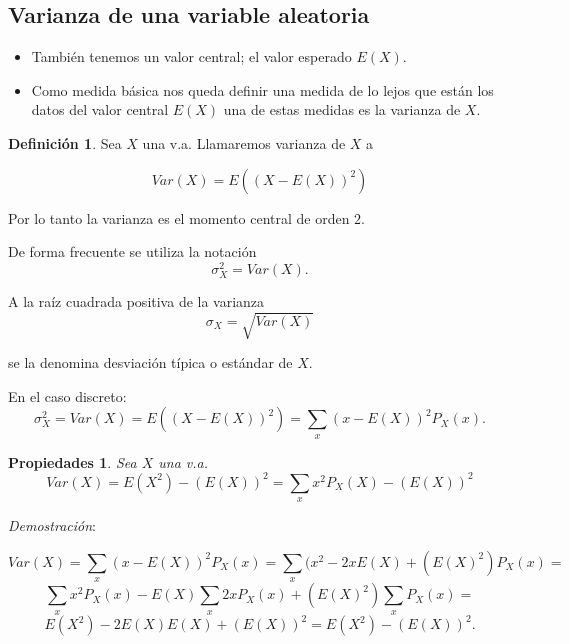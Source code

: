 \documentclass[handout]{beamer}\usepackage[]{graphicx}\usepackage[]{color}
\renewcommand{\emph}[1]{{\color{red}#1}}
\theoremstyle{plain}
\newtheorem{prop}{Propiedades}
\theoremstyle{definition}
\newtheorem{definicion}{Definición}
\begin{document}
\subsection{Varianza de una variable aleatoria}

\begin{frame}
\begin{itemize}
Hemmos descrito el comportamiento aleatorio de una v.a. discreta mediante $P_{X}$ y
$F_{X}$.
\item También tenemos un valor central; el valor esperado $E(X)$. 
\item Como medida básica nos queda definir una medida de lo lejos que están los datos del valor central $E(X)$ una de estas medidas es la varianza de $X$.
\end{itemize}
\end{frame}

\begin{frame}
\begin{definicion}
    Sea $X$ una v.a. Llamaremos \emph{varianza} de $X$ a

    $$Var(X)=E((X-E(X))^2)$$
\end{definicion}

Por lo tanto la varianza es el momento
      central de orden $2$.

    De forma frecuente se utiliza la notación $$\sigma_{X}^2=Var(X).$$
    
    A la raíz cuadrada positiva de la varianza
   $$\sigma_{X}=\sqrt{Var(X)}$$
   
   se la denomina desviación típica  o estándar de $X$.
\end{frame}

\begin{frame}
   En el caso discreto:
 $$\sigma_{X}^2=Var(X)=E((X-E(X))^2)=\sum_{x}(x-E(X))^2 P_{X}(x).$$

\end{frame}

\begin{frame}
 \begin{prop} Sea $X$ una v.a.
 $$Var(X)=E(X^2)-(E(X))^2=\sum_{x} x^2 P_{X}(X)-(E(X))^2$$
\end{prop}
 \textit{Demostración}:

 $$Var(X)=\sum_{x}(x-E(X))^2 P_{X}(x)=\sum_{x}(x^2 -2 x E(X)+(E(X)^2) P_{X}(x) =$$
 $$\sum_{x}x^2P_{X}(x) -E(X)\sum_{x}2 x P_{X}(x)
+(E(X)^2)\sum_{x} P_{X}(x)=$$ $$ E(X^2)- 2 E(X) E(X) + (E(X))^2=E(X^2)-(E(X))^2.
$$
\end{frame}
\end{document}
